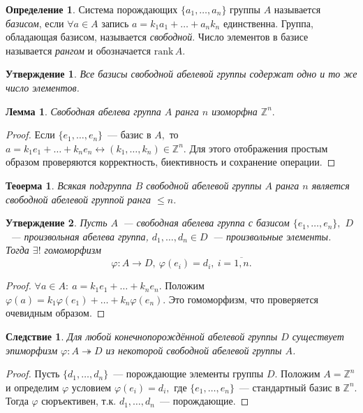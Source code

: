 \documentclass[a4paper, 14pt]{extarticle}
\newcommand{\integers}{\mathbb{Z}}
\newcommand{\rank}{\mathrm{rank} \,}
\renewcommand{\phi}{\varphi}
\theoremstyle{definition}
\newtheorem{definition}{Определение}
\theoremstyle{plain}
\newtheorem{theorem}{Теоерма}
\numberwithin{theorem}{section}
\numberwithin{definition}{section}
\newtheorem{statement}{Утверждение}
\numberwithin{statement}{section}
\newtheorem{lemma}{Лемма}
\numberwithin{lemma}{section}
\newtheorem*{consequence*}{Следствие}
\numberwithin{consequence}{section}
\begin{document}
        \begin{definition}
            Система порождающих ${\{a_1,\ldots,a_n\}}$ группы $A$ называется \textit{базисом}, если ${\forall a \in A}$ запись ${a = k_1a_1+\ldots+a_nk_n}$ единственна. Группа, обладающая базисом, называется \textit{свободной}. Число элементов в базисе называется \textit{рангом} и обозначается $\rank A$.
        \end{definition}
        \begin{statement}
            Все базисы свободной абелевой группы содержат одно и то же число элементов.
        \end{statement}
        \newpage
        \begin{lemma}
            Свободная абелева группа $A$ ранга $n$ изоморфна $\integers^n.$
        \end{lemma}
        \begin{proof}
            Если ${\{e_1,\ldots,e_n\}}$~--- базис в $A,$ то ${a = k_1e_1+\ldots+k_ne_n \leftrightarrow (k_1,\ldots,k_n) \in \integers^n.}$ Для этого отображения простым образом проверяются корректность, биективность и сохранение операции.
        \end{proof}
        \begin{theorem}
            Всякая подгруппа $B$ свободной абелевой группы $A$ ранга $n$ является свободной абелевой группой ранга $\leqslant n$. 
        \end{theorem}
        \begin{statement}
            Пусть $A$~--- свободная абелева группа с базисом ${\{e_1,\ldots,e_n\},}$ $D$~--- произвольная абелева группа, ${d_1,\ldots,d_n \in D}$~--- произвольные элементы. Тогда $\exists!$ гомоморфизм 
            \begin{equation*}
                \phi : A \rightarrow D, \ \phi(e_i) = d_i, \ i = \overline{1,n}.
            \end{equation*}
        \end{statement}
        \begin{proof}
            ${\forall a \in A{:} \ a = k_1e_1+\ldots+k_ne_n.}$\newline
            Положим ${\phi(a) = k_1\phi(e_1)+\ldots+k_n\phi(e_n).}$ Это гомоморфизм, что проверяется очевидным образом.
        \end{proof}
        \begin{consequence*}
            Для любой конечнопорождённой абелевой группы $D$ существует эпиморфизм ${\phi : A \twoheadrightarrow D}$ из некоторой свободной абелевой группы $A$. 
        \end{consequence*}
        \begin{proof}
            Пусть ${\{d_1,\ldots,d_n\}}$~--- порождающие элементы группы $D.$ Положим ${A = \integers^n}$ и определим $\phi$ условием ${\phi(e_i) = d_i,}$ где ${\{e_1,\ldots,e_n\}}$~--- стандартный базис в $\integers^n.$ Тогда $\phi$ сюръективен, т.к. ${d_1,\ldots,d_n}$~--- порождающие.
        \end{proof}
        \newpage
\end{document}
